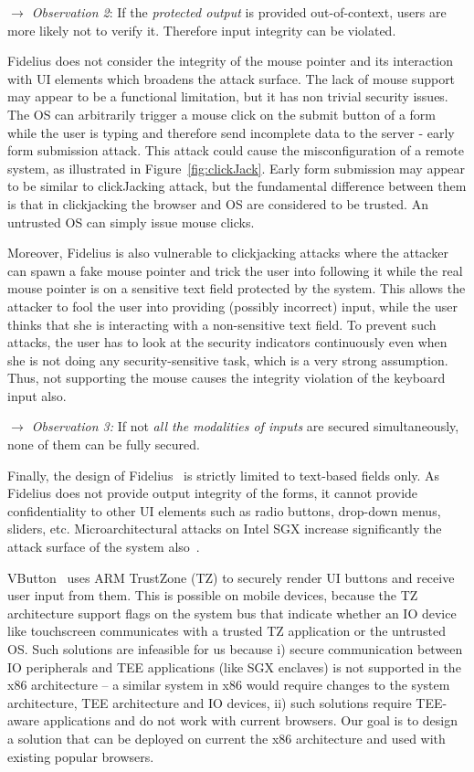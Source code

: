 \noindent\emph{$\rightarrow$ Observation 2}: If the \emph{protected output} is provided out-of-context, users are more likely not to verify it. Therefore input integrity can be violated.


Fidelius does not consider the integrity of the mouse pointer and its interaction with UI elements which broadens the attack surface. The lack of mouse support may appear to be a functional limitation, but it has non trivial security issues.
The OS can arbitrarily trigger a mouse click on the submit button of a form while the user is typing and therefore send incomplete data to the server - early form submission attack.
This attack could cause the misconfiguration of a remote system, as illustrated in Figure~\ref{fig:clickJack}. Early form submission may appear to be similar to clickJacking attack, but the fundamental difference between them is that in clickjacking the browser and OS are considered to be trusted. An untrusted OS can simply issue mouse clicks.

Moreover, Fidelius is also vulnerable to clickjacking attacks where the attacker can spawn a fake mouse pointer and trick the user into following it while the real mouse pointer is on a sensitive text field protected by the system. This allows the attacker to fool the user into providing (possibly incorrect) input, while the user thinks that she is interacting with a non-sensitive text field. To prevent such attacks, the user has to look at the security indicators continuously even when she is not doing any security-sensitive task, which is a very strong assumption. 
Thus, not supporting the mouse causes the integrity violation of the keyboard input also.

\noindent\emph{$\rightarrow$ Observation 3:} If not \emph{all the modalities of inputs} are secured simultaneously, none of them can be fully secured.


Finally, the design of Fidelius~\cite{Fidelius} is strictly limited to text-based fields only. As Fidelius does not provide output integrity of the forms, it cannot provide confidentiality to other UI elements such as radio buttons, drop-down menus, sliders, etc.
Microarchitectural attacks on Intel SGX increase significantly the attack surface of the system also~\cite{van2018foreshadow}.

 VButton~\cite{li2018vbutton} uses ARM TrustZone (TZ) to securely render UI buttons and receive user input from them. This is possible on mobile devices, because the TZ architecture support flags on the system bus that indicate whether an IO device like touchscreen communicates with a trusted TZ application or the untrusted OS. Such solutions are infeasible for us because i) secure communication between IO peripherals and TEE applications (like SGX enclaves) is not supported in the x86 architecture -- a similar system in x86 would require changes to the system architecture, TEE architecture and IO devices, ii) such solutions require TEE-aware applications and do not work with current browsers. Our goal is to design a solution that can be deployed on current the x86 architecture and used with existing popular browsers.


